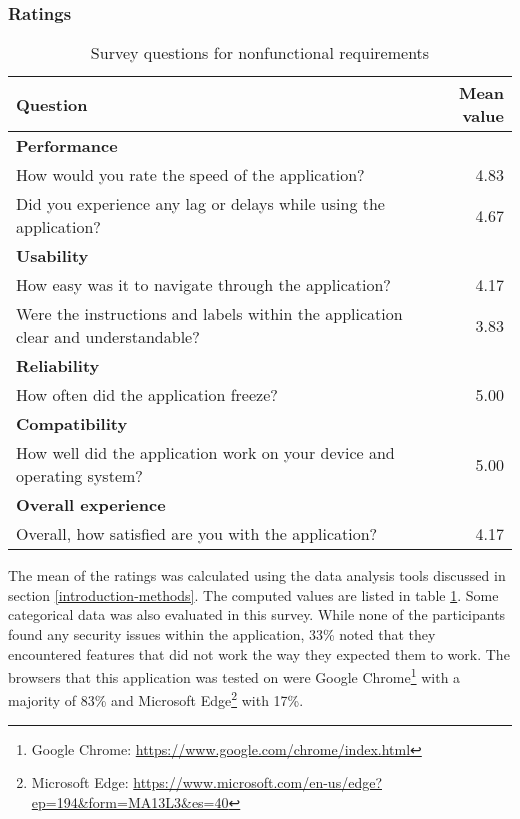 \subsubsection*{Ratings}

\begin{table}[!h]
    \centering
    \begin{tabular}{p{8cm} r}
    \hline
        \textbf{Question} & \textbf{Mean value} \\ 
     \hline
        \textbf{Performance} & \\
        How would you rate the speed of the application? & 4.83 \\
        Did you experience any lag or delays while using the application? & 4.67 \\
     \hline
        \textbf{Usability} & \\
        How easy was it to navigate through the application? & 4.17\\
        Were the instructions and labels within the application clear and understandable? & 3.83 \\
     \hline
        \textbf{Reliability} & \\
        How often did the application freeze? & 5.00 \\
     \hline
        \textbf{Compatibility} & \\
        How well did the application work on your device and operating system? & 5.00 \\
     \hline
        \textbf{Overall experience} & \\
        Overall, how satisfied are you with the application? & 4.17 \\
        
    \end{tabular}
    \caption{Survey questions for nonfunctional requirements}
    \label{tab:tool-ratings}
\end{table}

The mean of the ratings was calculated using the data analysis
tools discussed in section \ref{introduction-methods}.
The computed values are listed in table \ref{tab:tool-ratings}.
Some categorical data was also evaluated in this survey. 
While none of the participants found any security issues within the application, 
33\% noted that they encountered features that did not work the way they expected them to work.
The browsers that this application was tested on were Google Chrome\footnote{Google Chrome: \url{https://www.google.com/chrome/index.html}} with a majority of 83\% and Microsoft Edge\footnote{Microsoft Edge: \url{https://www.microsoft.com/en-us/edge?ep=194&form=MA13L3&es=40}} with 17\%. 

